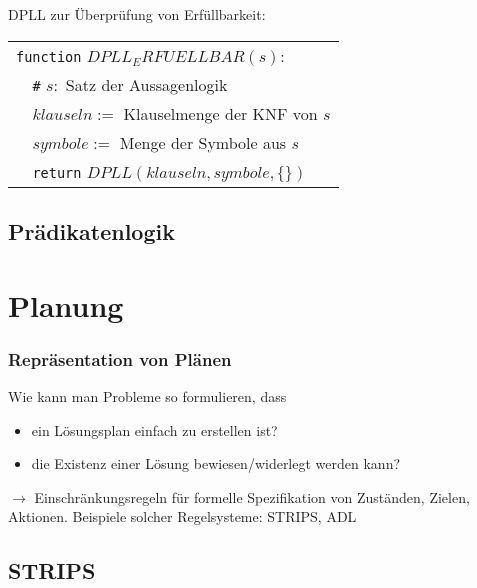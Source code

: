 DPLL zur Überprüfung von Erfüllbarkeit:
\begin{center}
\begin{tabular}{l}
\verb|function| $DPLL_ERFUELLBAR(s):$ \\
\verb|  #| $s:$ Satz der Aussagenlogik \\
\verb|  | $klauseln :=$ Klauselmenge der KNF von $s$ \\
\verb|  | $symbole :=$ Menge der Symbole aus $s$ \\
\verb|  return| $DPLL(klauseln, symbole, \{\})$
\end{tabular}
\end{center}

\subsection{Prädikatenlogik}

\section{Planung}

\subsubsection*{Repräsentation von Plänen}

Wie kann man Probleme so formulieren, dass
\begin{itemize}
\item ein Lösungsplan einfach zu erstellen ist?
\item die Existenz einer Lösung bewiesen/widerlegt werden kann?
\end{itemize}
$\to$ Einschränkungsregeln für formelle Spezifikation von Zuständen, Zielen, Aktionen. Beispiele solcher Regelsysteme: STRIPS, ADL

\subsection{STRIPS}

